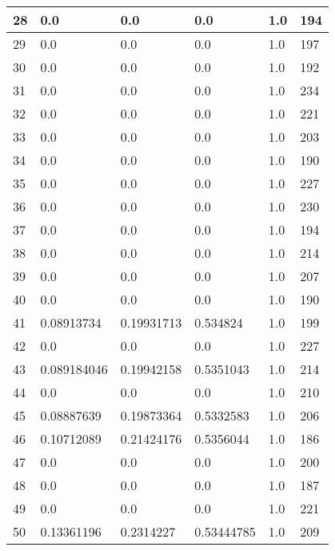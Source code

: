 \begin{longtable}{|l|l|l|l|l|l|}
28 & 0.0 & 0.0 & 0.0 & 1.0 & 194 \\ \hline 
29 & 0.0 & 0.0 & 0.0 & 1.0 & 197 \\ \hline 
30 & 0.0 & 0.0 & 0.0 & 1.0 & 192 \\ \hline 
31 & 0.0 & 0.0 & 0.0 & 1.0 & 234 \\ \hline 
32 & 0.0 & 0.0 & 0.0 & 1.0 & 221 \\ \hline 
33 & 0.0 & 0.0 & 0.0 & 1.0 & 203 \\ \hline 
34 & 0.0 & 0.0 & 0.0 & 1.0 & 190 \\ \hline 
35 & 0.0 & 0.0 & 0.0 & 1.0 & 227 \\ \hline 
36 & 0.0 & 0.0 & 0.0 & 1.0 & 230 \\ \hline 
37 & 0.0 & 0.0 & 0.0 & 1.0 & 194 \\ \hline 
38 & 0.0 & 0.0 & 0.0 & 1.0 & 214 \\ \hline 
39 & 0.0 & 0.0 & 0.0 & 1.0 & 207 \\ \hline 
40 & 0.0 & 0.0 & 0.0 & 1.0 & 190 \\ \hline 
41 & 0.08913734 & 0.19931713 & 0.534824 & 1.0 & 199 \\ \hline 
42 & 0.0 & 0.0 & 0.0 & 1.0 & 227 \\ \hline 
43 & 0.089184046 & 0.19942158 & 0.5351043 & 1.0 & 214 \\ \hline 
44 & 0.0 & 0.0 & 0.0 & 1.0 & 210 \\ \hline 
45 & 0.08887639 & 0.19873364 & 0.5332583 & 1.0 & 206 \\ \hline 
46 & 0.10712089 & 0.21424176 & 0.5356044 & 1.0 & 186 \\ \hline 
47 & 0.0 & 0.0 & 0.0 & 1.0 & 200 \\ \hline 
48 & 0.0 & 0.0 & 0.0 & 1.0 & 187 \\ \hline 
49 & 0.0 & 0.0 & 0.0 & 1.0 & 221 \\ \hline 
50 & 0.13361196 & 0.2314227 & 0.53444785 & 1.0 & 209 \\ \hline 
\end{longtable}